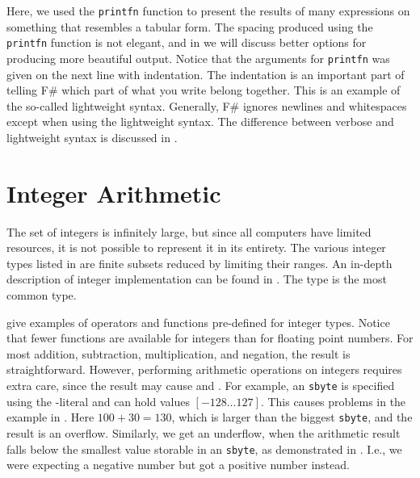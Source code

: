 \documentclass[springer.tex]{subfiles}
\begin{document}
Here, we used the \lstinline|printfn| function to present the results of many expressions on something that resembles a tabular form. The spacing produced using the \lstinline|printfn| function is not elegant, and in   we will discuss better options for producing more beautiful output. Notice that the arguments for \lstinline|printfn| was given on the next line with indentation. The indentation is an important part of telling F\# which part of what you write belong together. This is an example of the so-called lightweight syntax. Generally, F\# ignores newlines and whitespaces except when using the lightweight syntax. The difference between verbose and lightweight syntax is discussed in .

\section{Integer Arithmetic}
The set of integers is infinitely large, but since all computers have limited resources, it is not possible to represent it in its entirety. The various integer types listed in  are finite subsets reduced by limiting their ranges. 
An in-depth description of integer implementation can be found in . The type  is the most common type. 

 give examples of operators and functions pre-defined for integer types. Notice that fewer functions are available for integers than for floating point numbers. For most addition, subtraction, multiplication, and negation, the result is straightforward. However, performing arithmetic operations on integers requires extra care, since the result may cause  and . For example, an \lstinline|sbyte| is specified using the -literal and can hold values $[-128\ldots 127]$. This causes problems in the example in .
%
%
Here $100+30=130$, which is larger than the biggest \lstinline|sbyte|, and the result is an overflow. Similarly, we get an underflow, when the arithmetic result falls below the smallest value storable in an \lstinline|sbyte|, as demonstrated in .
%
%
I.e., we were expecting a negative number but got a positive number instead.
\end{document}
